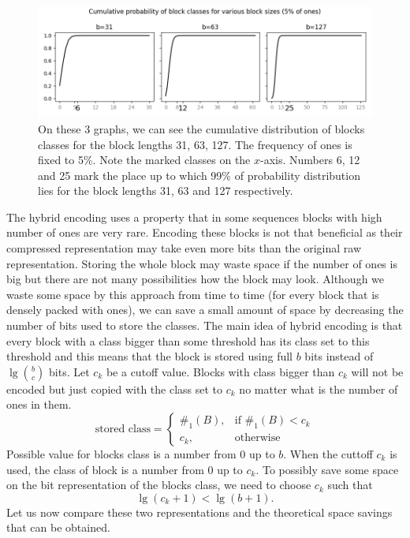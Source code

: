 \begin{figure}
	\centerline{
		\includegraphics[width=\textwidth]{images/hybrid_encoding_motivation}
	}
	\caption[TODO]{On these 3 graphs, we can see the cumulative distribution
    of blocks classes for the block lengths 31, 63, 127. The frequency of ones is
    fixed to 5\%. Note the marked classes on the $x$-axis. Numbers 6, 12 and
    25 mark the place up to which 99\% of probability distribution lies for
    the block lengths 31, 63 and 127 respectively.
	}
	\label{obr:hybridEncodingDistribution}
\end{figure}

The hybrid encoding uses a property that in some sequences blocks with high number
of ones are very rare. Encoding these blocks is not that beneficial as their
compressed representation may take even more bits than the original raw
representation. Storing the whole block may waste space if the number of
ones is big but there are not many possibilities how the block may look.
Although we waste some space by this approach from time to time (for every
block that is densely packed with ones), we can save a small amount of space
by decreasing the number of bits used to store the classes. The main idea
of hybrid encoding is that every block with a class bigger than some threshold
has its class set to this threshold and this means that the block
is stored using full $b$ bits instead of $\lg {b\choose c}$ bits.
Let $c_k$ be a cutoff value. Blocks with class bigger than $c_k$ will not be
encoded but just copied with the class set to $c_k$ no matter what is the
number of ones in them.
\[
    \text{stored class} = 
\begin{cases}
    \#_1(B),& \text{if } \#_1(B) < c_k\\
    c_k,              & \text{otherwise}
\end{cases}
\]
Possible value for blocks class is a number from 0 up to $b$. When the cuttoff $c_k$ is
used, the class of block is a number from 0 up to $c_k$. To possibly save some space on
the bit representation of the blocks class, we need to choose $c_k$ such that
$$\lg (c_k+1) < \lg (b+1).$$ Let us now compare these two representations
and the theoretical space savings that can be obtained.

